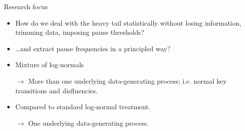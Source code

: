 
\begin{frame}{Research focus}

\begin{small}
\begin{itemize}
	\item How do we deal with the heavy tail statistically without losing information, trimming data, imposing pause thresholds?
	\item \dots and extract pause frequencies in a principled way?
	\item Mixture of log-normals \parencite{almond2012preliminary,baaijen2012keystroke}
	\item[$\rightarrow$] More than one underlying data-generating process; i.e. normal key transitions and disfluencies.		 
	\item Compared to standard log-normal treatment.
	\item[$\rightarrow$] One underlying data-generating process.
	

\end{itemize}
\end{small}

\end{frame}